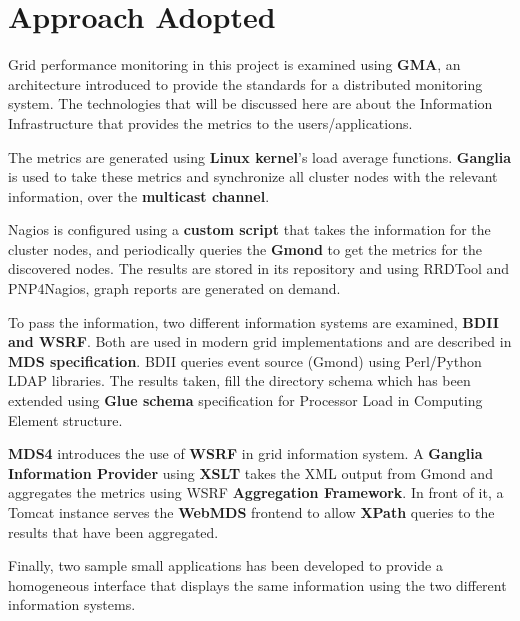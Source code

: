 
\section{Approach Adopted}

Grid performance monitoring in this project is examined using {\bf GMA}, an architecture introduced to provide the standards for a distributed monitoring system. The technologies that will be discussed here are about the Information Infrastructure that provides the metrics to the users/applications.

The metrics are generated using {\bf Linux kernel}'s load average functions. {\bf Ganglia} is used to take these metrics and synchronize all cluster nodes with the relevant information, over the {\bf multicast channel}.

Nagios is configured using a {\bf custom script} that takes the information for the cluster nodes, and periodically queries the {\bf Gmond} to get the metrics for the discovered nodes. The results are stored in its repository and using RRDTool and PNP4Nagios, graph reports are generated on demand.

To pass the information, two different information systems are examined, {\bf BDII and WSRF}. Both are used in modern grid implementations and are described in {\bf MDS specification}. BDII queries event source (Gmond) using Perl/Python LDAP libraries. The results taken, fill the directory schema which has been extended using {\bf Glue schema} specification for Processor Load in Computing Element structure.

{\bf MDS4} introduces the use of {\bf WSRF} in grid information system. A {\bf Ganglia Information Provider} using {\bf XSLT} takes the XML output from Gmond and aggregates the metrics using WSRF {\bf Aggregation Framework}. In front of it, a Tomcat instance serves the {\bf WebMDS} frontend to allow {\bf XPath} queries to the results that have been aggregated.

Finally, two sample small applications has been developed to provide a homogeneous interface that displays the same information using the two different information systems.

